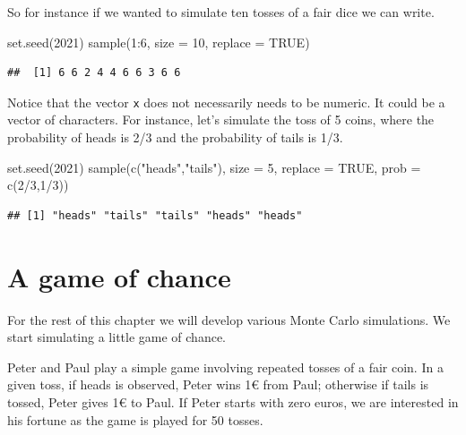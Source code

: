 \documentclass[
]{book}
\newenvironment{Shaded}{\begin{snugshade}}{\end{snugshade}}
\newcommand{\AttributeTok}[1]{\textcolor[rgb]{0.77,0.63,0.00}{#1}}
\newcommand{\ConstantTok}[1]{\textcolor[rgb]{0.00,0.00,0.00}{#1}}
\newcommand{\DecValTok}[1]{\textcolor[rgb]{0.00,0.00,0.81}{#1}}
\newcommand{\FunctionTok}[1]{\textcolor[rgb]{0.00,0.00,0.00}{#1}}
\newcommand{\NormalTok}[1]{#1}
\newcommand{\SpecialCharTok}[1]{\textcolor[rgb]{0.00,0.00,0.00}{#1}}
\newcommand{\StringTok}[1]{\textcolor[rgb]{0.31,0.60,0.02}{#1}}
\theoremstyle{definition}
\theoremstyle{definition}
\theoremstyle{definition}
\theoremstyle{definition}
\theoremstyle{remark}
\begin{document}
So for instance if we wanted to simulate ten tosses of a fair dice we can write.

\begin{Shaded}
\begin{Highlighting}[]
\FunctionTok{set.seed}\NormalTok{(}\DecValTok{2021}\NormalTok{)}
\FunctionTok{sample}\NormalTok{(}\DecValTok{1}\SpecialCharTok{:}\DecValTok{6}\NormalTok{, }\AttributeTok{size =} \DecValTok{10}\NormalTok{, }\AttributeTok{replace =} \ConstantTok{TRUE}\NormalTok{)}
\end{Highlighting}
\end{Shaded}

\begin{verbatim}
##  [1] 6 6 2 4 4 6 6 3 6 6
\end{verbatim}

Notice that the vector \texttt{x} does not necessarily needs to be numeric. It could be a vector of characters. For instance, let's simulate the toss of 5 coins, where the probability of heads is 2/3 and the probability of tails is 1/3.

\begin{Shaded}
\begin{Highlighting}[]
\FunctionTok{set.seed}\NormalTok{(}\DecValTok{2021}\NormalTok{)}
\FunctionTok{sample}\NormalTok{(}\FunctionTok{c}\NormalTok{(}\StringTok{"heads"}\NormalTok{,}\StringTok{"tails"}\NormalTok{), }\AttributeTok{size =} \DecValTok{5}\NormalTok{, }\AttributeTok{replace =} \ConstantTok{TRUE}\NormalTok{, }\AttributeTok{prob =} \FunctionTok{c}\NormalTok{(}\DecValTok{2}\SpecialCharTok{/}\DecValTok{3}\NormalTok{,}\DecValTok{1}\SpecialCharTok{/}\DecValTok{3}\NormalTok{))}
\end{Highlighting}
\end{Shaded}

\begin{verbatim}
## [1] "heads" "tails" "tails" "heads" "heads"
\end{verbatim}

\hypertarget{a-game-of-chance}{%
\section{A game of chance}\label{a-game-of-chance}}

For the rest of this chapter we will develop various Monte Carlo simulations. We start simulating a little game of chance.

Peter and Paul play a simple game involving repeated tosses of a fair coin. In a given toss, if heads is observed, Peter wins 1€ from Paul; otherwise if tails is tossed, Peter gives 1€ to Paul. If Peter starts with zero euros, we are interested in his fortune as the game is played for 50 tosses.
\end{document}
